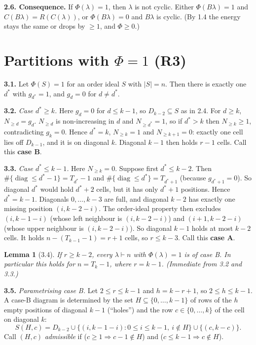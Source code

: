 \documentclass[11pt]{article}
\newtheorem{lemma}{Lemma}
\theoremstyle{remark}
\newcommand{\diag}{\operatorname{diag}}
\begin{document}
\textbf{2.6. Consequence.} If $\Phi(\lambda)=1$, then $\lambda$ is not cyclic. Either $\Phi(B\lambda)=1$ and
$C(B\lambda)=R(C(\lambda))$, or $\Phi(B\lambda)=0$ and $B\lambda$ is cyclic. (By 1.4 the energy stays the same or
drops by $\ge 1$, and $\Phi\ge0$.)

\section{Partitions with $\Phi=1$ (R3)}

\textbf{3.1.} Let $\Phi(S)=1$ for an order ideal $S$ with $|S|=n$. Then there is exactly one $d^*$ with
$g_{d^*}=1$, and $g_d=0$ for $d\ne d^*$.

\textbf{3.2.} \emph{Case $d^*\ge k$.} Here $g_d=0$ for $d\le k-1$, so $D_{k-2}\subseteq S$ as in 2.4. For $d\ge k$,
$N_{\ge d}=g_d$. $N_{\ge d}$ is non-increasing in $d$ and $N_{\ge d^*}=1$, so if $d^*>k$ then $N_{\ge k}\ge1$,
contradicting $g_k=0$. Hence $d^*=k$, $N_{\ge k}=1$ and $N_{\ge k+1}=0$: exactly one cell lies off $D_{k-1}$, and
it is on diagonal $k$. Diagonal $k-1$ then holds $r-1$ cells. Call this \textbf{case B}.

\textbf{3.3.} \emph{Case $d^*\le k-1$.} Here $N_{\ge k}=0$. Suppose first $d^*\le k-2$. Then
$\#\{\diag\le d^*-1\}=T_{d^*}-1$ and $\#\{\diag\le d^*\}=T_{d^*+1}$ (because $g_{d^*+1}=0$). So diagonal $d^*$
would hold $d^*+2$ cells, but it has only $d^*+1$ positions. Hence $d^*=k-1$. Diagonals $0,\dots,k-3$ are full,
and diagonal $k-2$ has exactly one missing position $(i,k-2-i)$. The order-ideal property then excludes
$(i,k-1-i)$ (whose left neighbour is $(i,k-2-i)$) and $(i+1,k-2-i)$ (whose upper neighbour is $(i,k-2-i)$). So
diagonal $k-1$ holds at most $k-2$ cells. It holds $n-(T_{k-1}-1)=r+1$ cells, so $r\le k-3$. Call this
\textbf{case A}.

\begin{lemma}[3.4]\label{lem:R3}
If $r\ge k-2$, every $\lambda\vdash n$ with $\Phi(\lambda)=1$ is of case B. In particular this holds for
$n=T_k-1$, where $r=k-1$. (Immediate from 3.2 and 3.3.)
\end{lemma}

\textbf{3.5.} \emph{Parametrising case B.} Let $2\le r\le k-1$ and $h=k-r+1$, so $2\le h\le k-1$. A case-B diagram
is determined by the set $H\subseteq\{0,\dots,k-1\}$ of rows of the $h$ empty positions of diagonal $k-1$
(``holes'') and the row $c\in\{0,\dots,k\}$ of the cell on diagonal $k$:
\[
S(H,c)=D_{k-2}\cup\{(i,k-1-i):0\le i\le k-1,\ i\notin H\}\cup\{(c,k-c)\}.
\]
Call $(H,c)$ \emph{admissible} if ($c\ge1\Rightarrow c-1\notin H$) and ($c\le k-1\Rightarrow c\notin H$).
\end{document}
